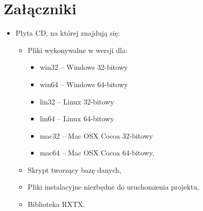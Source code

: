 \section{Załączniki}
\begin{itemize}
\item Płyta CD, na której znajdują się:
\begin{itemize}
\item Pliki wykonywalne w wersji dla:
\begin{itemize}
\item win32 -- Windows 32-bitowy
\item win64 -- Windows 64-bitowy 
\item lin32 -- Linux 32-bitowy
\item lin64 -- Linux 64-bitowy
\item mac32 -- Mac OSX Cocoa 32-bitowy
\item mac64 -- Mac OSX Cocoa 64-bitowy,
\end{itemize}
\item Skrypt tworzący bazę danych,
\item Pliki instalacyjne niezbędne do uruchomienia projektu,
\item Biblioteka RXTX.
\end{itemize}
\end{itemize}
